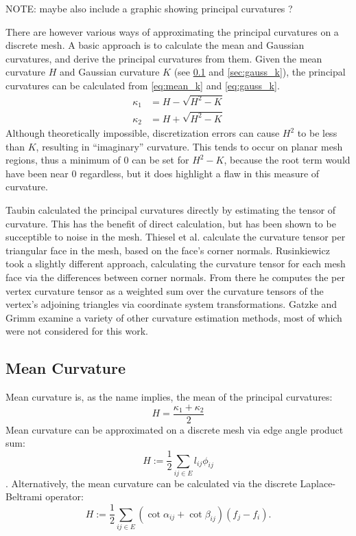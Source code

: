 NOTE: maybe also include a graphic showing principal curvatures ?

There are however various ways of approximating the principal curvatures on a discrete mesh\cite{EstCurvOnTriMesh, DiscDiffGeoOpsTriMani}.
A basic approach is to calculate the mean and Gaussian curvatures, and derive the principal curvatures from them\cite{DDGAppIntro_19_discrete_k_2, Gauss_mean_k_notes}.
Given the mean curvature $H$ and Gaussian curvature $K$ (see \ref{sec:mean_k} and \ref{sec:gauss_k}), the principal curvatures can be calculated from \ref{eq:mean_k} and \ref{eq:gauss_k}.
\begin{align}
	\kappa_1 &= H - \sqrt{H^2 - K} \\
	\kappa_2 &= H + \sqrt{H^2 - K}
\end{align}
Although theoretically impossible, discretization errors can cause $H^2$ to be less than $K$, resulting in ``imaginary'' curvature.
This tends to occur on planar mesh regions, thus a minimum of 0 can be set for $H^2 - K$, because the root term would have been near 0 regardless, but it does highlight a flaw in this measure of curvature.

Taubin calculated the principal curvatures directly by estimating the tensor of curvature\cite{TaubinTensor}.
This has the benefit of direct calculation, but has been shown to be succeptible to noise in the mesh\cite{Comp_k_notes}.
Thiesel et al. calculate the curvature tensor per triangular face in the mesh, based on the face's corner normals\cite{Norm_based_k_tensor_est}.
Rusinkiewicz took a slightly different approach, calculating the curvature tensor for each mesh face via the differences between corner normals\cite{SRTensor}.
From there he computes the per vertex curvature tensor as a weighted sum over the curvature tensors of the vertex's adjoining triangles via coordinate system transformations.
Gatzke and Grimm examine a variety of other curvature estimation methods\cite{EstCurvOnTriMesh}, most of which were not considered for this work.

\subsection{Mean Curvature}\label{sec:mean_k}
Mean curvature is, as the name implies, the mean of the principal curvatures\cite{DDGAppIntro_19_discrete_k_2}:
\begin{equation}\label{eq:mean_k}
	H = \frac{\kappa_1 + \kappa_2}{2}
\end{equation}
Mean curvature can be approximated on a discrete mesh via edge angle product sum:
\begin{equation}
	H := \frac{1}{2}\sum_{i j \in E}l_{ij} \phi_{ij}
\end{equation}.
Alternatively, the mean curvature can be calculated via the discrete Laplace-Beltrami operator:
\begin{equation}
	H := \frac{1}{2}\sum_{i j \in E}(\cot \alpha_{ij} + \cot \beta_{ij})(f_j - f_i).
\end{equation}

